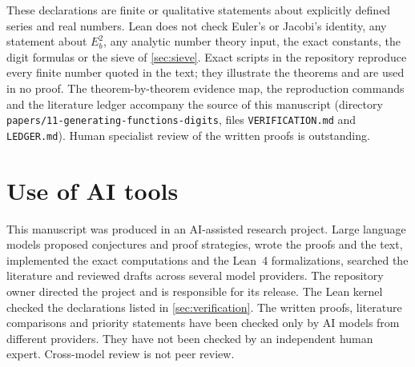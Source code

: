 \documentclass[11pt]{article}
\begin{document}
These declarations are finite or qualitative statements about explicitly defined series and real
numbers. Lean does not check Euler's or Jacobi's identity, any statement about $E_b^2$, any analytic
number theory input, the exact constants, the digit formulas or the sieve of \cref{sec:sieve}. Exact
scripts in the repository reproduce every finite number quoted in the text; they illustrate the
theorems and are used in no proof. The theorem-by-theorem evidence map, the reproduction commands
and the literature ledger accompany the source of this manuscript (directory
\texttt{papers/11-generating-functions-digits}, files \texttt{VERIFICATION.md} and
\texttt{LEDGER.md}). Human specialist review of the written proofs is outstanding.

\section{Use of AI tools}\label{sec:ai}

This manuscript was produced in an AI-assisted research project. Large language models proposed
conjectures and proof strategies, wrote the proofs and the text, implemented the exact computations
and the Lean~4 formalizations, searched the literature and reviewed drafts across several model
providers. The repository owner directed the project and is responsible for its release. The Lean
kernel checked the declarations listed in \cref{sec:verification}. The written proofs, literature
comparisons and priority statements have been checked only by AI models from different providers.
They have not been checked by an independent human expert. Cross-model review is not peer review.



\end{document}
